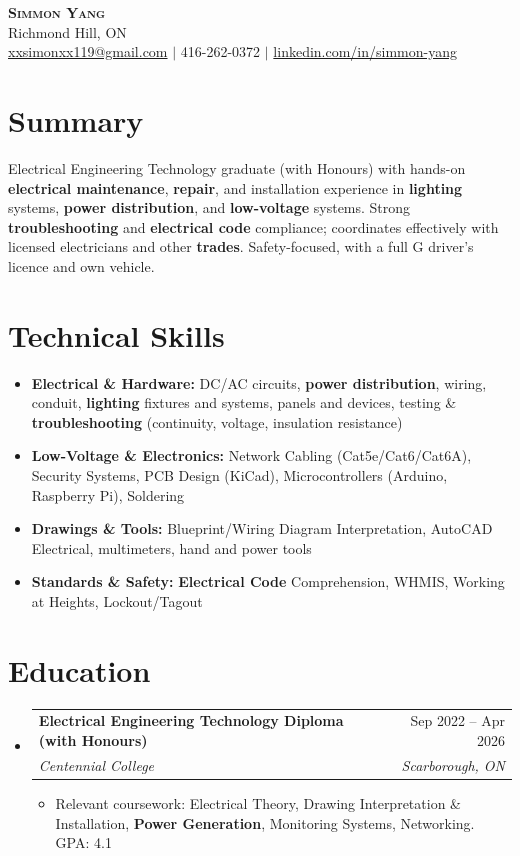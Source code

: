 \documentclass[letterpaper,11pt]{article}
\makeatletter
\newcommand{\resumeItem}[1]{\item\small{{#1 \vspace{-2pt}}}}
\newcommand{\resumeSubheading}[4]{
  \vspace{-4pt}\item
    \begin{tabular*}{0.97\textwidth}[t]{l@{\extracolsep{\fill}}r}
      \textbf{#1} & #2 \\
      \textit{\small #3} & \textit{\small #4} \\
    \end{tabular*}\vspace{-8pt}
}
\newcommand{\resumeSubHeadingListStart}{\begin{itemize}[leftmargin=0.15in, label={}]}
\newcommand{\resumeSubHeadingListEnd}{\end{itemize}}
\newcommand{\resumeItemListStart}{\begin{itemize}}
\newcommand{\resumeItemListEnd}{\end{itemize}\vspace{-5pt}}
\makeatother
\begin{document}
\begin{center}
    \textbf{\Huge \scshape Simmon Yang} \\ \vspace{1pt}
    Richmond Hill, ON \\
    \href{mailto:xxsimonxx119@gmail.com}{xxsimonxx119@gmail.com} $|$ 416-262-0372 $|$
    \href{https://www.linkedin.com/in/simmon-yang/}{linkedin.com/in/simmon-yang}
\end{center}

\section{Summary}
Electrical Engineering Technology graduate (with Honours) with hands-on \textbf{electrical maintenance}, \textbf{repair}, and installation experience in \textbf{lighting} systems, \textbf{power distribution}, and \textbf{low-voltage} systems. Strong \textbf{troubleshooting} and \textbf{electrical code} compliance; coordinates effectively with licensed electricians and other \textbf{trades}. Safety-focused, with a full G driver's licence and own vehicle.

\section{Technical Skills}
\begin{itemize}[leftmargin=0.15in]
  \item \textbf{Electrical \& Hardware:} DC/AC circuits, \textbf{power distribution}, wiring, conduit, \textbf{lighting} fixtures and systems, panels and devices, testing \& \textbf{troubleshooting} (continuity, voltage, insulation resistance)
  \item \textbf{Low-Voltage \& Electronics:} Network Cabling (Cat5e/Cat6/Cat6A), Security Systems, PCB Design (KiCad), Microcontrollers (Arduino, Raspberry Pi), Soldering
  \item \textbf{Drawings \& Tools:} Blueprint/Wiring Diagram Interpretation, AutoCAD Electrical, multimeters, hand and power tools
  \item \textbf{Standards \& Safety:} \textbf{Electrical Code} Comprehension, WHMIS, Working at Heights, Lockout/Tagout
\end{itemize}

\section{Education}
\resumeSubHeadingListStart
\resumeSubheading
  {Electrical Engineering Technology Diploma (with Honours)}{Sep 2022 -- Apr 2026}
  {Centennial College}{Scarborough, ON}
\resumeItemListStart
  \resumeItem{Relevant coursework: Electrical Theory, Drawing Interpretation \& Installation, \textbf{Power Generation}, Monitoring Systems, Networking. GPA: 4.1}
\resumeItemListEnd
\resumeSubHeadingListEnd
\end{document}
